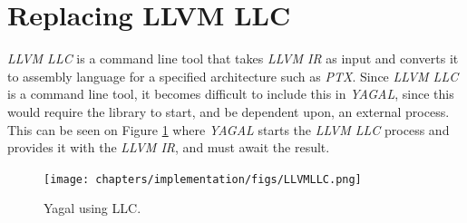 \section{Replacing LLVM LLC} \label{sec:llcReplacement}
\textit{LLVM LLC} is a command line tool that takes \textit{LLVM IR} as input and converts it to assembly language for a specified architecture such as \textit{PTX}. Since \textit{LLVM LLC} is a command line tool, it becomes difficult to include this in \textit{YAGAL}, since this would require the library to start, and be dependent upon, an external process. This can be seen on Figure \ref{fig:yagalLLC} where \textit{YAGAL} starts the \textit{LLVM LLC} process and provides it with the \textit{LLVM IR}, and must await the result.

\begin{figure}
    \centering
    \begin{minipage}[t]{0.55\textwidth}\centering%
        \texttt{[image: chapters/implementation/figs/LLVMLLC.png]}
        \caption{Yagal using LLC.}
        \label{fig:yagalLLC}
    \end{minipage}\hfill
    \begin{minipage}[t]{0.3\textwidth}\centering%

\end{minipage}
\end{figure}

